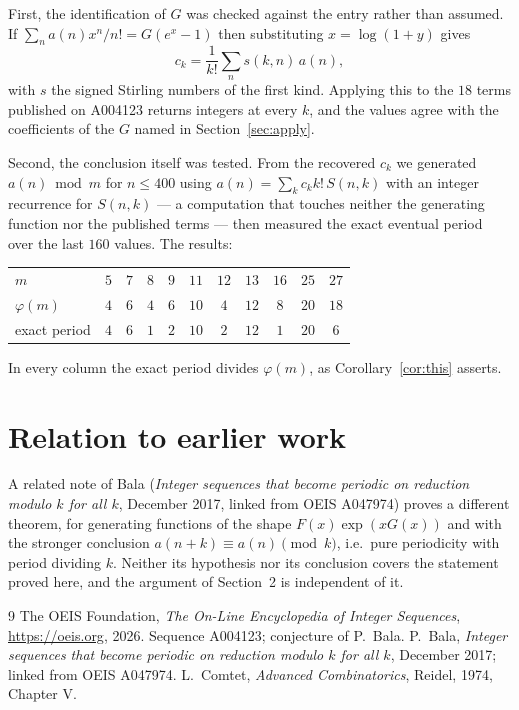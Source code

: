 \documentclass[11pt,a4paper]{article}
\theoremstyle{plain}
\theoremstyle{definition}
\begin{document}
First, the identification of $G$ was checked against the entry rather than assumed. If
$\sum_{n}a(n)x^{n}/n!=G(e^{x}-1)$ then substituting $x=\log(1+y)$ gives
\[
c_{k}=\frac{1}{k!}\sum_{n}s(k,n)\,a(n),
\]
with $s$ the signed Stirling numbers of the first kind. Applying this to the
$18$ terms published on A004123 returns integers at every $k$, and the values
agree with the coefficients of the $G$ named in Section~\ref{sec:apply}.

Second, the conclusion itself was tested. From the recovered $c_{k}$ we generated
$a(n)\bmod m$ for $n\le400$ using $a(n)=\sum_{k}c_{k}k!\,S(n,k)$ with an integer
recurrence for $S(n,k)$ --- a computation that touches neither the generating function nor
the published terms --- then measured the exact eventual period over the last $160$
values. The results:

\begin{center}
\begin{tabular}{@{}lcccccccccc@{}}
\toprule
$m$  & $5$ & $7$ & $8$ & $9$ & $11$ & $12$ & $13$ & $16$ & $25$ & $27$\\
$\varphi(m)$  & $4$ & $6$ & $4$ & $6$ & $10$ & $4$ & $12$ & $8$ & $20$ & $18$\\
exact period  & $4$ & $6$ & $1$ & $2$ & $10$ & $2$ & $12$ & $1$ & $20$ & $6$\\
\bottomrule
\end{tabular}
\end{center}

\noindent
In every column the exact period divides $\varphi(m)$, as Corollary~\ref{cor:this}
asserts.

\section{Relation to earlier work}

A related note of Bala (\emph{Integer sequences that become periodic on reduction modulo
$k$ for all $k$}, December 2017, linked from OEIS A047974) proves a different theorem, for
generating functions of the shape $F(x)\exp(xG(x))$ and with the stronger conclusion
$a(n+k)\equiv a(n)\pmod{k}$, i.e.\ pure periodicity with period dividing $k$. Neither its
hypothesis nor its conclusion covers the statement proved here, and the argument of
Section~2 is independent of it.

\begin{thebibliography}{9}
 The OEIS Foundation, \emph{The On-Line Encyclopedia of Integer Sequences},
\url{https://oeis.org}, 2026. Sequence A004123; conjecture of P.\ Bala.
 P.\ Bala, \emph{Integer sequences that become periodic on reduction modulo
$k$ for all $k$}, December 2017; linked from OEIS A047974.
 L.\ Comtet, \emph{Advanced Combinatorics}, Reidel, 1974, Chapter V.
\end{thebibliography}
\end{document}
